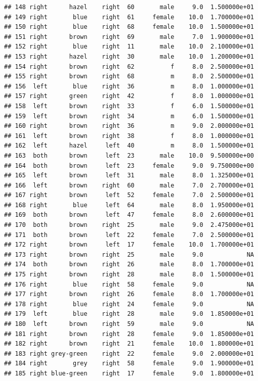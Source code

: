 \documentclass[]{article}
\begin{document}
\begin{verbatim}
## 148 right      hazel    right  60       male     9.0  1.500000e+01
## 149 right       blue    right  61     female    10.0  1.700000e+01
## 150 right       blue    right  68     female    10.0  1.500000e+01
## 151 right      brown    right  69       male     7.0  1.900000e+01
## 152 right       blue    right  11       male    10.0  2.100000e+01
## 153 right      hazel    right  30       male    10.0  1.200000e+01
## 154 right      brown    right  62          f     8.0  2.500000e+01
## 155 right      brown    right  68          m     8.0  2.500000e+01
## 156  left       blue    right  36          m     8.0  1.000000e+01
## 157 right      green    right  42          f     8.0  1.000000e+01
## 158  left      brown    right  33          f     6.0  1.500000e+01
## 159  left      brown    right  34          m     6.0  1.500000e+01
## 160 right      brown    right  36          m     9.0  2.000000e+01
## 161  left      brown    right  38          f     8.0  1.000000e+01
## 162  left      hazel     left  40          m     8.0  1.500000e+01
## 163  both      brown     left  23       male    10.0  9.500000e+00
## 164  both      brown     left  23     female     9.0  9.750000e+00
## 165  left      brown     left  31       male     8.0  1.325000e+01
## 166  left      brown    right  60       male     7.0  2.700000e+01
## 167 right      brown     left  52     female     7.0  2.500000e+01
## 168 right       blue     left  64       male     8.0  1.950000e+01
## 169  both      brown     left  47     female     8.0  2.600000e+01
## 170  both      brown    right  25       male     9.0  2.475000e+01
## 171  both      brown     left  22     female     7.0  2.500000e+01
## 172 right      brown     left  17     female    10.0  1.700000e+01
## 173 right      brown    right  25       male     9.0            NA
## 174  both      brown    right  26       male     8.0  1.700000e+01
## 175 right      brown    right  28       male     8.0  1.500000e+01
## 176 right       blue    right  58     female     9.0            NA
## 177 right      brown    right  26     female     8.0  1.700000e+01
## 178 right       blue    right  24     female     9.0            NA
## 179  left       blue    right  28       male     9.0  1.850000e+01
## 180  left      brown    right  59       male     9.0            NA
## 181 right      brown    right  28     female     9.0  1.850000e+01
## 182 right      brown    right  21     female    10.0  1.800000e+01
## 183 right grey-green    right  22     female     9.0  2.000000e+01
## 184 right       grey    right  58     female     9.0  1.900000e+01
## 185 right blue-green    right  17     female     9.0  1.800000e+01

\end{verbatim}
\end{document}
